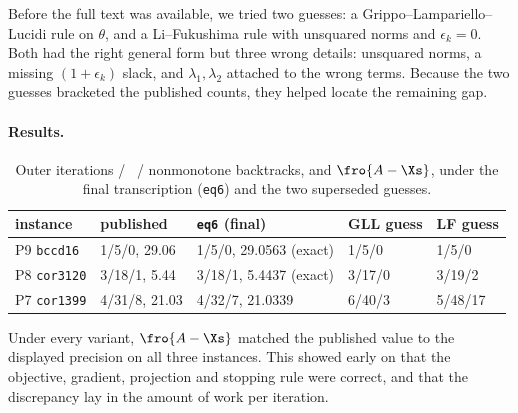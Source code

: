 Before the full text was available, we tried two guesses: a
Grippo--Lampariello--Lucidi rule on $\theta$, and a Li--Fukushima rule with
unsquared norms and $\epsilon_k=0$. Both had the right general form but three
wrong details: unsquared norms, a missing $(1+\epsilon_k)$ slack, and
$\lambda_1,\lambda_2$ attached to the wrong terms. Because the two guesses
bracketed the published counts, they helped locate the remaining gap.

\paragraph{Results.}
\begin{table}[h]
\centering
\caption{Outer iterations / \EVDs\ / nonmonotone backtracks, and
$\fro{A-\Xs}$, under the final transcription (\texttt{eq6}) and the two
superseded guesses.}
\label{tab:agd-full}
\small
\begin{tabular}{lllll}
\toprule
instance & published & \texttt{eq6} (final) & GLL guess & LF guess\\
\midrule
P9 \texttt{bccd16}  & 1/5/0, 29.06  & 1/5/0, 29.0563 (exact) & 1/5/0 & 1/5/0\\
P8 \texttt{cor3120} & 3/18/1, 5.44  & 3/18/1, 5.4437 (exact) & 3/17/0 & 3/19/2\\
P7 \texttt{cor1399} & 4/31/8, 21.03 & 4/32/7, 21.0339 & 6/40/3 & 5/48/17\\
\bottomrule
\end{tabular}
\end{table}
Under every variant, $\fro{A-\Xs}$ matched the published value to the
displayed precision on all three instances. This showed early on that the
objective, gradient, projection and stopping rule were correct, and that the
discrepancy lay in the amount of work per iteration.

